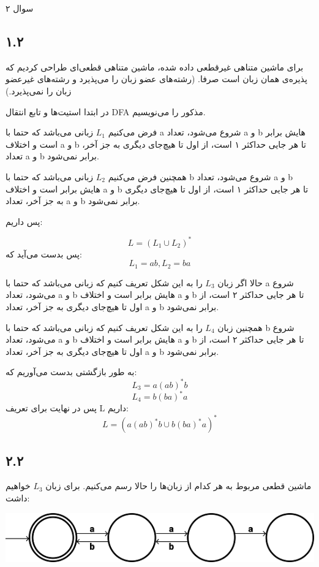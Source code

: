 سوال ۲

\subsection*{۱.۲}

برای ماشین متناهی غیرقطعی داده شده، ماشین متناهی قطعی‌ای طراحی کردیم که پذیره‌ی همان زبان است صرفا. (رشته‌های عضو زبان را می‌پذیرد و رشته‌های غیرعضو زبان را نمی‌پذیرد.)

در ابتدا استیت‌ها و تابع انتقال DFA مذکور را می‌نویسیم.


فرض می‌کنیم
$L_1$
زبانی می‌باشد که حتما با a شروع می‌شود، تعداد a و b هایش برابر است و اختلاف a و b تا هر جایی حداکثر ۱ است، از اول تا هیچ‌جای دیگری به جز آخر، تعداد a و b برابر نمی‌شود.

همچنین فرض می‌کنیم
$L_2$
زبانی می‌باشد که حتما با b شروع می‌شود، تعداد a و b هایش برابر است و اختلاف a و b تا هر جایی حداکثر ۱ است، از اول تا هیچ‌جای دیگری به جز آخر، تعداد a و b برابر نمی‌شود.

پس داریم:

$$L = (L_1 \cup L_2)^*$$
پس بدست می‌آید که:
$$L_1 = ab , L_2 = ba$$

حالا اگر زبان
$L_3$
را به این شکل تعریف کنیم که زبانی می‌باشد که حتما با a شروع می‌شود، تعداد a و b هایش برابر است و اختلاف a و b تا هر جایی حداکثر ۲ است، از اول تا هیچ‌جای دیگری به جز آخر، تعداد a و b برابر نمی‌شود.

همچنین زبان 
$L_4$
را به این شکل تعریف کنیم که زبانی می‌باشد که حتما با b شروع می‌شود، تعداد a و b هایش برابر است و اختلاف a و b تا هر جایی حداکثر ۲ است، از اول تا هیچ‌جای دیگری به جز آخر، تعداد a و b برابر نمی‌شود.

به طور بازگشتی بدست می‌آوریم که:
$$L_3 = a(ab)^*b$$
$$L_4 = b(ba)^*a$$
پس در نهایت برای تعریف L داریم:
$$L = (a(ab)^*b \cup b(ba)^*a)^*$$

\subsection*{۲.۲}

ماشین قطعی مربوط به هر کدام از زبان‌ها را حالا رسم می‌کنیم.
برای زبان
$L_3$
خواهیم داشت:

\begin{center}
	\includegraphics{DFA15}
\end{center}

